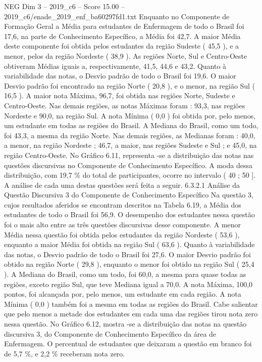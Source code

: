 \begin{textsample}{NEG Dim 3 – 2019\_c6 – Score 15.00 – 2019\_c6/enade\_2019\_enf\_ba60297fd1.txt}
Enquanto no Componente de Formação Geral a Média para estudantes de Enfermagem de todo o Brasil foi 17,6, na parte de Conhecimento Específico, a Média foi 42,7.
A maior Média deste componente foi obtida pelos estudantes da região Sudeste ( 45,5 ), e a menor, pelos da região Nordeste ( 38,9 ).
As regiões Norte, Sul e Centro-Oeste obtiveram Médias iguais a, respectivamente, 41,5, 44,6 e 43,2.
Quanto à variabilidade das notas, o Desvio padrão de todo o Brasil foi 19,6.
O maior Desvio padrão foi encontrado na região Norte ( 20,8 ), e o menor, na região Sul ( 16,5 ).
A maior nota Máxima, 96,7, foi obtida nas regiões Norte, Sudeste e Centro-Oeste.
Nas demais regiões, as notas Máximas foram : 93,3, nas regiões Nordeste e 90,0, na região Sul.
A nota Mínima ( 0,0 ) foi obtida por, pelo menos, um estudante em todas as regiões do Brasil.
A Mediana do Brasil, como um todo, foi 43,3, a mesma da região Norte.
Nas demais regiões, as Medianas foram : 40,0, a menor, na região Nordeste ; 46,7, a maior, nas regiões Sudeste e Sul ; e 45,0, na região Centro-Oeste.
No Gráfico 6.11, representa -se a distribuição das notas nas questões discursivas no Componente de Conhecimento Específico.
A moda dessa distribuição, com 19,7 \% do total de participantes, ocorre no intervalo ( 40 ; 50 ].
A análise de cada uma destas questões será feita a seguir. 6.3.2.1 Análise da Questão Discursiva 3 do Componente de Conhecimento Específico Na questão 3, cujos resultados aferidos se encontram descritos na Tabela 6.19, a Média dos estudantes de todo o Brasil foi 56,9.
O desempenho dos estudantes nessa questão foi o mais alto entre as três questões discursivas desse componente.
A menor Média nessa questão foi obtida pelos estudantes da região Nordeste ( 53,6 ), enquanto a maior Média foi obtida na região Sul ( 63,6 ).
Quanto à variabilidade das notas, o Desvio padrão de todo o Brasil foi 27,6.
O maior Desvio padrão foi obtido na região Norte ( 29,8 ), enquanto o menor foi obtido na região Sul ( 25,4 ).
A Mediana do Brasil, como um todo, foi 60,0, a mesma para quase todas as regiões, exceto região Sul, que teve Mediana igual a 70,0.
A nota Máxima, 100,0 pontos, foi alcançada por, pelo menos, um estudante em cada região.
A nota Mínima ( 0,0 ) também foi a mesma em todas as regiões do Brasil.
Cabe salientar que pelo menos a metade dos estudantes em cada uma das regiões tirou nota zero nessa questão.
No Gráfico 6.12, mostra -se a distribuição das notas na questão discursiva 3, do Componente de Conhecimento Específico da área de Enfermagem.
O percentual de estudantes que deixaram a questão em branco foi de 5,7 \%, e 2,2 \% receberam nota zero.

\end{textsample}
